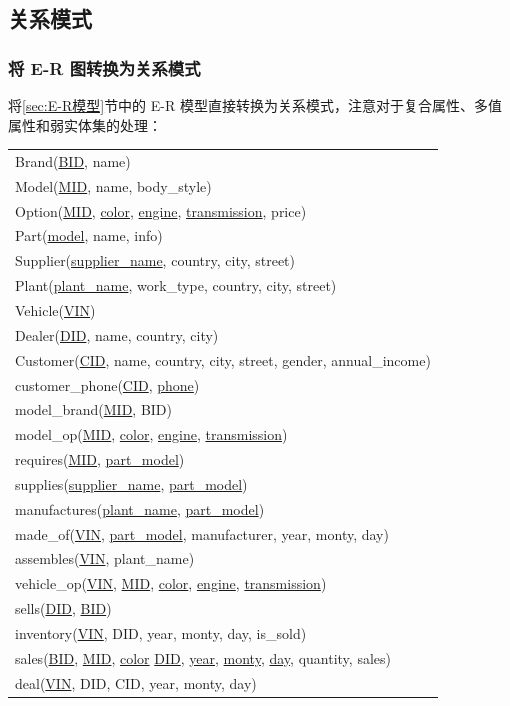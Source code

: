 \documentclass[hyperref,a4paper,UTF8]{ctexart}
\begin{document}
\subsection{关系模式}

\subsubsection{将 E-R 图转换为关系模式}

将\ref{sec:E-R模型}节中的 E-R 模型直接转换为关系模式，注意对于复合属性、多值属性和弱实体集的处理：

\begin{center}
    \begin{tabular}{l}
        Brand(\underline{BID}, name)\\
        Model(\underline{MID}, name, body\_style)\\
        Option(\underline{MID}, \underline{color}, \underline{engine}, \underline{transmission}, price)\\
        Part(\underline{model}, name, info)\\
        Supplier(\underline{supplier\_name}, country, city, street)\\
        Plant(\underline{plant\_name}, work\_type, country, city, street)\\
        Vehicle(\underline{VIN})\\
        Dealer(\underline{DID}, name, country, city)\\
        Customer(\underline{CID}, name, country, city, street, gender, annual\_income)\\
        customer\_phone(\underline{CID}, \underline{phone})\\
        model\_brand(\underline{MID}, BID)\\
        model\_op(\underline{MID}, \underline{color}, \underline{engine}, \underline{transmission})\\
        requires(\underline{MID}, \underline{part\_model})\\
        supplies(\underline{supplier\_name}, \underline{part\_model})\\
        manufactures(\underline{plant\_name}, \underline{part\_model})\\
        made\_of(\underline{VIN}, \underline{part\_model}, manufacturer, year, monty, day)\\
        assembles(\underline{VIN}, plant\_name)\\
        vehicle\_op(\underline{VIN}, \underline{MID}, \underline{color}, \underline{engine}, \underline{transmission})\\
        sells(\underline{DID}, \underline{BID})\\
        inventory(\underline{VIN}, DID, year, monty, day, is\_sold)\\
        sales(\underline{BID}, \underline{MID}, \underline{color} \underline{DID}, \underline{year}, \underline{monty}, \underline{day}, quantity, sales)\\
        deal(\underline{VIN}, DID, CID, year, monty, day)
    \end{tabular}
\end{center}
\end{document}
